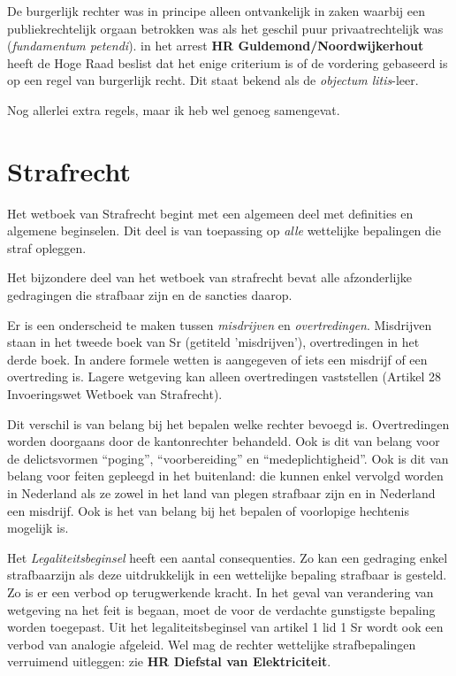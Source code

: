 \documentclass{article}
\begin{document}
De burgerlijk rechter was in principe alleen ontvankelijk in zaken waarbij een
publiekrechtelijk orgaan betrokken was als het geschil puur privaatrechtelijk
was (\emph{fundamentum petendi}). in het arrest \textbf{HR
Guldemond/Noordwijkerhout} heeft de Hoge Raad beslist dat het enige criterium
is of de vordering gebaseerd is op een regel van burgerlijk recht. Dit staat
bekend als de \emph{objectum litis}-leer.

Nog allerlei extra regels, maar ik heb wel genoeg samengevat.

\section{Strafrecht}

Het wetboek van Strafrecht begint met een algemeen deel met definities en
algemene beginselen. Dit deel is van toepassing op \emph{alle} wettelijke
bepalingen die straf opleggen.

Het bijzondere deel van het wetboek van strafrecht bevat alle afzonderlijke
gedragingen die strafbaar zijn en de sancties daarop.

Er is een onderscheid te maken tussen \emph{misdrijven} en
\emph{overtredingen}. Misdrijven staan in het tweede boek van Sr (getiteld
'misdrijven'), overtredingen in het derde boek. In andere formele wetten is
aangegeven of iets een misdrijf of een overtreding is. Lagere wetgeving kan
alleen overtredingen vaststellen (Artikel 28 Invoeringswet Wetboek van
Strafrecht).

Dit verschil is van belang bij het bepalen welke rechter bevoegd is.
Overtredingen worden doorgaans door de kantonrechter behandeld. Ook is dit van
belang voor de delictsvormen ``poging'', ``voorbereiding'' en
``medeplichtigheid''. Ook is dit van belang voor feiten gepleegd in het
buitenland: die kunnen enkel vervolgd worden in Nederland als ze zowel in het
land van plegen strafbaar zijn en in Nederland een misdrijf. Ook is het van
belang bij het bepalen of voorlopige hechtenis mogelijk is.

Het \emph{Legaliteitsbeginsel} heeft een aantal consequenties. Zo kan een
gedraging enkel strafbaarzijn als deze uitdrukkelijk in een wettelijke bepaling
strafbaar is gesteld. Zo is er een verbod op terugwerkende kracht. In het geval
van verandering van wetgeving na het feit is begaan, moet de voor de verdachte
gunstigste bepaling worden toegepast. Uit het legaliteitsbeginsel van artikel
1 lid 1 Sr wordt ook een verbod van analogie afgeleid. Wel mag de rechter
wettelijke strafbepalingen verruimend uitleggen: zie \textbf{HR Diefstal van
Elektriciteit}.
\end{document}
